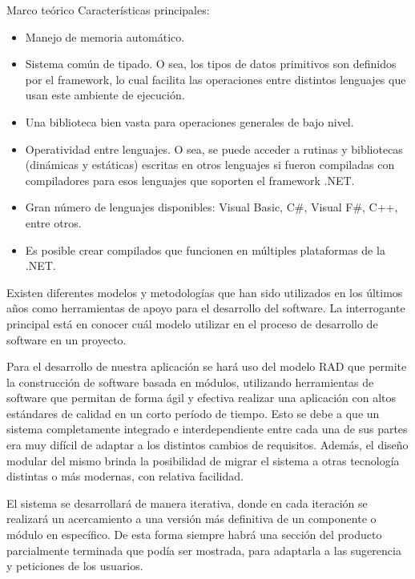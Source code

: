 \begin{thesischapter}{1} {Marco teórico}
    \vspace{2pt}
    Características principales:
    \begin{itemize}
        \item Manejo de memoria automático.
        \item Sistema común de tipado. O sea, los tipos de datos primitivos son definidos por el framework, lo cual facilita las operaciones entre distintos lenguajes que usan este ambiente de ejecución.
        \item Una biblioteca bien vasta para operaciones generales de bajo nivel.
        \item Operatividad entre lenguajes. O sea, se puede acceder a rutinas y bibliotecas (dinámicas y estáticas) escritas en otros lenguajes si fueron compiladas con compiladores para esos lenguajes que soporten el framework .NET.
        \item Gran número de lenguajes disponibles: Visual Basic, C\#, Visual F\#, C++, entre otros.
        \item Es posible crear compilados que funcionen en múltiples plataformas de la .NET.
    \end{itemize}

    Existen diferentes modelos y metodologías que han sido utilizados en los últimos años como 
    herramientas de apoyo para el desarrollo del software. La interrogante principal está en 
    conocer cuál modelo utilizar en el proceso de desarrollo de software en un proyecto.~\cite{DELGADOOLIVERA2021}
    
    \vspace{2pt}
    Para el desarrollo de nuestra aplicación se hará uso del modelo RAD que permite la construcción de software basada en
    módulos, utilizando herramientas de software que permitan de forma ágil y efectiva realizar una
    aplicación con altos estándares de calidad en un corto período de tiempo. Esto se debe a que un sistema completamente integrado e interdependiente entre cada una de sus
    partes era muy difícil de adaptar a los distintos cambios de requisitos. Además,
    el diseño modular del mismo brinda la posibilidad de migrar el sistema a otras
    tecnología distintas o más modernas, con relativa facilidad.
    
    \vspace{2pt}
    El sistema se desarrollará de manera iterativa, donde en cada iteración se
    realizará un acercamiento a una versión más definitiva de un componente o
    módulo en específico. De esta forma siempre habrá una sección del producto
    parcialmente terminada que podía ser mostrada, para adaptarla a las
    sugerencia y peticiones de los usuarios.
\end{thesischapter}